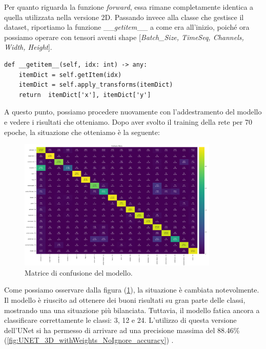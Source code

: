 Per quanto riguarda la funzione \textit{forward}, essa rimane completamente identica a 
quella utilizzata nella versione 2D.
Passando invece alla classe che gestisce il dataset, riportiamo la funzione 
\_\_\textit{getitem}\_\_  a come era all'inizio, poiché ora 
possiamo operare con tensori 
aventi shape [\textit{Batch\_Size, TimeSeq, Channels, Width}\textit{, Height}].
\begin{lstlisting}
def __getitem__(self, idx: int) -> any:
    itemDict = self.getItem(idx)
    itemDict = self.apply_transforms(itemDict)
    return  itemDict['x'], itemDict['y'] 
\end{lstlisting}
A questo punto, possiamo procedere nuovamente con l'addestramento del modello e vedere i 
risultati che otteniamo. 
\newpage
Dopo aver svolto il training della rete per 70 epoche, la situazione che otteniamo 
è la seguente:

\begin{figure}[H]
    \centering
    \includegraphics[angle=270,origin=c,width=0.85\textwidth]{Immagini/sperimentazione/UNET_3D_withWeights_confusionMatrix_Edit.png}
    \caption{Matrice di confusione del modello.}
    \label{fig:UNET_3D_withWeights_NoIgnore_confusionMatrix}
\end{figure}

Come possiamo osservare dalla figura (\ref{fig:UNET_3D_withWeights_NoIgnore_confusionMatrix}),
la situazione è cambiata notevolmente. Il modello è riuscito ad ottenere dei buoni risultati 
su gran parte delle classi, mostrando una una situazione 
più bilanciata. Tuttavia, il modello fatica ancora a 
classificare correttamente le classi: 3, 12 e 24.
L'utilizzo di questa versione dell'UNet si ha permesso di arrivare ad una  
precisione massima del 88.46\% (\ref{fig:UNET_3D_withWeights_NoIgnore_accuracy}) . 


